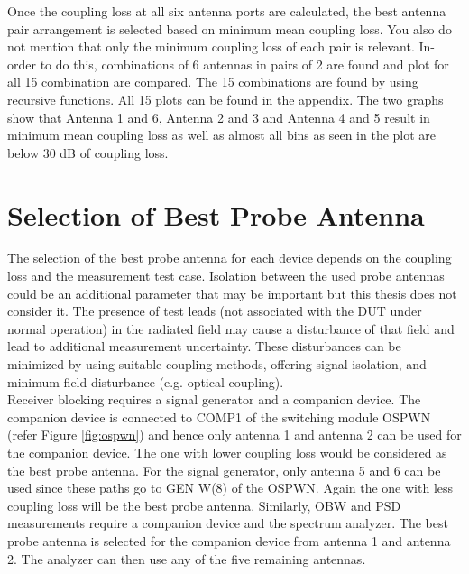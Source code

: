 Once the coupling loss at all six antenna ports are calculated, the best antenna pair arrangement is selected based on minimum mean coupling loss. You also do not mention that only the minimum coupling loss of each pair is relevant. In-order to do this, combinations of 6 antennas in pairs of 2 are found and plot for all 15 combination are compared. The 15 combinations are found by using recursive functions. All 15 plots can be found in the appendix. 
The two graphs show that Antenna 1 and 6, Antenna 2 and 3 and Antenna 4 and 5 result in minimum mean coupling loss as well as almost all bins as seen in the plot are below 30 dB of coupling loss.







\section{Selection of Best Probe Antenna}
The selection of the best probe antenna for each device depends on the coupling loss and the measurement test case. Isolation between the used probe antennas could be an additional parameter that may be important but this thesis does not consider it. The presence of test leads (not associated with the DUT under normal operation) in the radiated field may cause a disturbance of that field and lead to additional measurement uncertainty. These disturbances can be minimized by using suitable coupling methods, offering signal isolation, and minimum field disturbance (e.g. optical coupling). \\

Receiver blocking requires a signal generator and a companion device. The companion device is connected to COMP1 of the switching module OSPWN (refer Figure \ref{fig:ospwn}) and hence only antenna 1 and antenna 2 can be used for the companion device. The one with lower coupling loss would be considered as the best probe antenna. For the signal generator, only antenna 5 and 6 can be used since these paths go to GEN W(8) of the OSPWN. Again the one with less coupling loss will be the best probe antenna. Similarly, \acf{OBW} and \acf{PSD} measurements require a companion device and the spectrum analyzer. The best probe antenna is selected for the companion device from antenna 1 and antenna 2. The analyzer can then use any of the five remaining antennas.



















